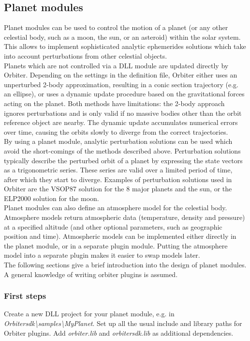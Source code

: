 \documentclass[Orbiter Developer Manual.tex]{subfiles}
\begin{document}
\subsection{Planet modules}
\label{ssec:planet_module}
Planet modules can be used to control the motion of a planet (or any other celestial body, such as a moon, the sun, or an asteroid) within the solar system. This allows to implement sophisticated analytic ephemerides solutions which take into account perturbations from other celestial objects.\\
Planets which are not controlled via a DLL module are updated directly by Orbiter. Depending on the settings in the definition file, Orbiter either uses an unperturbed 2-body approximation, resulting in a conic section trajectory (e.g. an ellipse), or uses a dynamic update procedure based on the gravitational forces acting on the planet. Both methods have limitations: the 2-body approach ignores perturbations and is only valid if no massive bodies other than the orbit reference object are nearby. The dynamic update accumulates numerical errors over time, causing the orbits slowly to diverge from the correct trajectories.\\
By using a planet module, analytic perturbation solutions can be used which avoid the short-comings of the methods described above. Perturbation solutions typically describe the perturbed orbit of a planet by expressing the state vectors as a trigonometric series. These series are valid over a limited period of time, after which they start to diverge. Examples of perturbation solutions used in Orbiter are the VSOP87 solution for the 8 major planets and the sun, or the ELP2000 solution for the moon.\\
Planet modules can also define an atmosphere model for the celestial body. Atmosphere models return atmospheric data (temperature, density and pressure) at a specified altitude (and other optional parameters, such as geographic position and time). Atmospheric models can be implemented either directly in the planet module, or in a separate plugin module. Putting the atmosphere model into a separate plugin makes it easier to swap models later.\\
The following sections give a brief introduction into the design of planet modules. A general knowledge of writing orbiter plugins is assumed.

\subsubsection{First steps}
Create a new DLL project for your planet module, e.g. in \textit{Orbitersdk\textbackslash samples\textbackslash MyPlanet}. Set up all the usual include and library paths for Orbiter plugins. Add \textit{orbiter.lib} and \textit{orbitersdk.lib} as additional dependencies.
\end{document}
